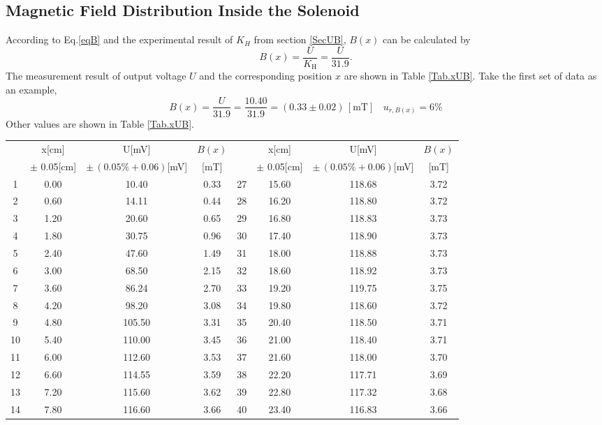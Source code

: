 \documentclass{article}
\begin{document}
	\subsection{Magnetic Field Distribution Inside the Solenoid}

According to Eq.\eqref{eqB} and the experimental result of $K_{H}$ from section \ref{SecUB}, $B(x)$ can be calculated by 
$$\displaystyle B(x) = \frac{U}{K_\text{H}} = \frac{U}{31.9} .$$ 
The measurement result of output voltage $U$ and the corresponding position $x$ are shown in Table \ref{Tab.xUB}. 
Take the first set of data as an example, $$B(x) = \frac{U}{31.9} = \frac{10.40}{31.9} = (0.33 \pm 0.02) \,[\text{mT}]~~~~u_{r,B(x)} = 6\%$$ 
Other values are shown in Table \ref{Tab.xUB}.

\begin{table}[H]
\centering
\begin{tabular}{cccc||cccc}
\toprule
   & x[cm]   & U[mV]    & $B(x)$    &    & x[cm]   & U[mV]  & $B(x)$   \\
   & $\pm$ 0.05[cm]    & $\pm \, (0.05\%+0.06)$[mV]      & [mT]    &    & $\pm$ 0.05[cm]    & $\pm \, (0.05\%+0.06)$[mV]       & [mT]   \\ \midrule
1  & 0.00  & 10.40  & 0.33 & 27 & 15.60 & 118.68 & 3.72 \\
2  & 0.60  & 14.11  & 0.44 & 28 & 16.20 & 118.80 & 3.72 \\
3  & 1.20  & 20.60  & 0.65 & 29 & 16.80 & 118.83 & 3.73 \\
4  & 1.80  & 30.75  & 0.96 & 30 & 17.40 & 118.90 & 3.73 \\
5  & 2.40  & 47.60  & 1.49 & 31 & 18.00 & 118.88 & 3.73 \\
6  & 3.00  & 68.50  & 2.15 & 32 & 18.60 & 118.92 & 3.73 \\
7  & 3.60  & 86.24  & 2.70 & 33 & 19.20 & 119.75 & 3.75 \\
8  & 4.20  & 98.20  & 3.08 & 34 & 19.80 & 118.60 & 3.72 \\
9  & 4.80  & 105.50 & 3.31 & 35 & 20.40 & 118.50 & 3.71 \\
10 & 5.40  & 110.00 & 3.45 & 36 & 21.00 & 118.40 & 3.71 \\
11 & 6.00  & 112.60 & 3.53 & 37 & 21.60 & 118.00 & 3.70 \\
12 & 6.60  & 114.55 & 3.59 & 38 & 22.20 & 117.71 & 3.69 \\
13 & 7.20  & 115.60 & 3.62 & 39 & 22.80 & 117.32 & 3.68 \\
14 & 7.80  & 116.60 & 3.66 & 40 & 23.40 & 116.83 & 3.66 \\

\end{tabular}
\end{table}
\end{document}
